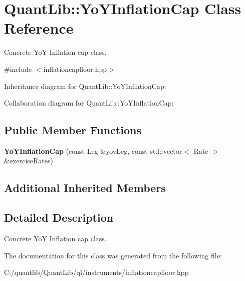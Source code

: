 \section{Quant\+Lib\+:\+:Yo\+Y\+Inflation\+Cap Class Reference}
\label{class_quant_lib_1_1_yo_y_inflation_cap}


Concrete YoY Inflation cap class.  




{\ttfamily \#include $<$inflationcapfloor.\+hpp$>$}



Inheritance diagram for Quant\+Lib\+:\+:Yo\+Y\+Inflation\+Cap\+:


Collaboration diagram for Quant\+Lib\+:\+:Yo\+Y\+Inflation\+Cap\+:
\subsection*{Public Member Functions}
\begin{DoxyCompactItemize}
\item 
{\bfseries Yo\+Y\+Inflation\+Cap} (const Leg \&yoy\+Leg, const std\+::vector$<$ Rate $>$ \&exercise\+Rates)\label{class_quant_lib_1_1_yo_y_inflation_cap_a2d9999b29cde188fd0f6e1472d51a650}

\end{DoxyCompactItemize}
\subsection*{Additional Inherited Members}


\subsection{Detailed Description}
Concrete YoY Inflation cap class. 



The documentation for this class was generated from the following file\+:\begin{DoxyCompactItemize}
\item 
C\+:/quantlib/\+Quant\+Lib/ql/instruments/inflationcapfloor.\+hpp\end{DoxyCompactItemize}
